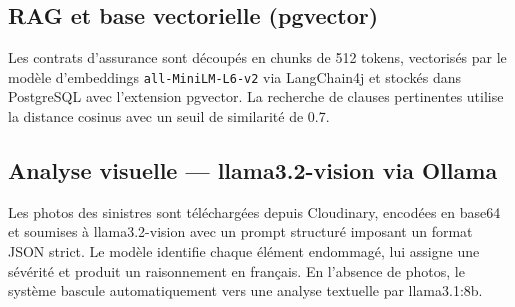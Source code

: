 \subsection{RAG et base vectorielle (pgvector)}

Les contrats d'assurance sont découpés en chunks de 512 tokens, vectorisés par
le modèle d'embeddings \texttt{all-MiniLM-L6-v2} via LangChain4j et stockés
dans PostgreSQL avec l'extension pgvector. La recherche de clauses pertinentes
utilise la distance cosinus avec un seuil de similarité de 0.7.

\subsection{Analyse visuelle — llama3.2-vision via Ollama}

Les photos des sinistres sont téléchargées depuis Cloudinary, encodées en base64
et soumises à llama3.2-vision avec un prompt structuré imposant un format JSON
strict. Le modèle identifie chaque élément endommagé, lui assigne une sévérité
et produit un raisonnement en français. En l'absence de photos, le système
bascule automatiquement vers une analyse textuelle par llama3.1:8b.

\newpage    